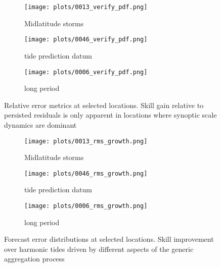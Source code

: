 \documentclass[jmse,article,submit,moreauthors,pdftex,10pt,a4paper]{mdpi}
\begin{document}


\begin{figure}[H]
\centering
    \begin{subfigure}[b]{0.3\textwidth}
        \texttt{[image: plots/0013\_verify\_pdf.png]}
        \caption{Midlatitude storms}
    \end{subfigure}
    \begin{subfigure}[b]{0.3\textwidth}
        \texttt{[image: plots/0046\_verify\_pdf.png]}
        \caption{tide prediction datum}
    \end{subfigure}
        \begin{subfigure}[b]{0.3\textwidth}
        \texttt{[image: plots/0006\_verify\_pdf.png]}
        \caption{long period}
    \end{subfigure}
\caption{ Relative error metrics at selected locations. Skill gain relative to persisted residuals is only apparent in locations where synoptic scale dynamics are dominant}
\label{fig:pdf_c}
\end{figure}   


\begin{figure}[H]
\centering
    \begin{subfigure}[b]{0.3\textwidth}
        \texttt{[image: plots/0013\_rms\_growth.png]}
        \caption{Midlatitude storms}
    \end{subfigure}
    \begin{subfigure}[b]{0.3\textwidth}
        \texttt{[image: plots/0046\_rms\_growth.png]}
        \caption{tide prediction datum}
    \end{subfigure}
        \begin{subfigure}[b]{0.3\textwidth}
        \texttt{[image: plots/0006\_rms\_growth.png]}
        \caption{long period}
    \end{subfigure}
\caption{ Forecast error distributions at selected locations. Skill improvement over harmonic tides driven by different aspects of the generic aggregation process}
\label{fig:rms_c}
\end{figure}   
\end{document}
